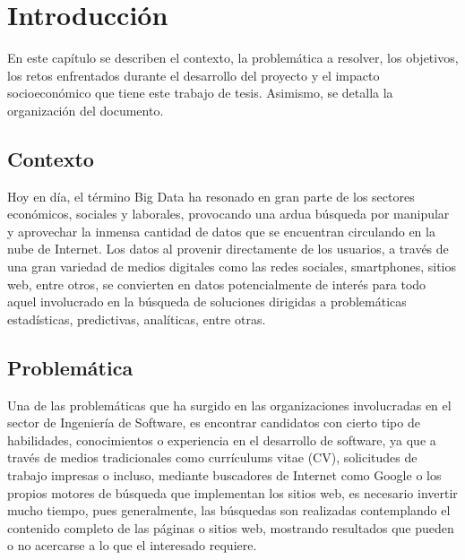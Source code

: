%
%

\let\textcircled=\pgftextcircled
\chapter{Introducci\'on}
\label{chap:intro}

En este capítulo se describen el contexto, la problemática a resolver, los objetivos, los retos enfrentados durante el desarrollo del proyecto y el impacto socioeconómico que tiene este trabajo de tesis. Asimismo, se detalla la organización del documento.

\section{Contexto}
\label{sec:sec01}

Hoy en d\'ia, el t\'ermino Big Data ha resonado en gran parte de los sectores econ\'omicos, sociales y laborales, provocando una ardua b\'usqueda por manipular y aprovechar la inmensa cantidad de datos que se encuentran circulando en la nube de Internet. Los datos al provenir directamente de los usuarios, a trav\'es de una gran variedad de medios digitales como las redes sociales, smartphones, sitios web, entre otros, se convierten en datos potencialmente de inter\'es para todo aquel involucrado en la b\'usqueda de soluciones dirigidas a problem\'aticas estad\'isticas, predictivas, anal\'iticas, entre otras.

\section{Problem\'atica}
\label{sec:sec02}

Una de las problemáticas que ha surgido en las organizaciones involucradas en el sector de Ingenier\'ia de Software, es encontrar candidatos con cierto tipo de habilidades, conocimientos o experiencia en el desarrollo de software, ya que a trav\'es de medios tradicionales como curr\'iculums vitae (CV), solicitudes de trabajo impresas o  incluso, mediante buscadores de Internet como Google o los propios motores de b\'usqueda que implementan los sitios web, es necesario invertir mucho tiempo, pues generalmente, las búsquedas son realizadas contemplando el contenido completo de las páginas o sitios web, mostrando resultados que pueden o no acercarse a lo que el interesado requiere. 

